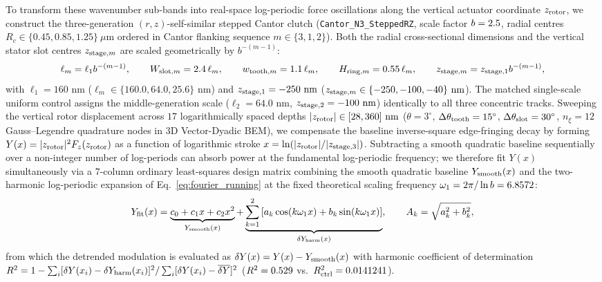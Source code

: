 \documentclass[pdflatex,sn-nature]{sn-jnl}
\begin{document}
To transform these wavenumber sub-bands into real-space log-periodic force oscillations along the vertical actuator coordinate $z_{\rm rotor}$, we construct the three-generation $(r,z)$-self-similar stepped Cantor clutch (\texttt{Cantor\_N3\_SteppedRZ}, scale factor $b = 2.5{}$, radial centres $R_c \in \{0.45, 0.85, 1.25\}\ \mu\text{m}$ ordered in Cantor flanking sequence $m \in \{3, 1, 2\}$). Both the radial cross-sectional dimensions and the vertical stator slot centres $z_{{\rm stage},m}$ are scaled geometrically by $b^{-(m-1)}$:
\begin{equation}
\ell_m = \ell_1 b^{-(m-1)}, \qquad
W_{{\rm slot},m} = 2.4\,\ell_m, \qquad
w_{{\rm tooth},m} = 1.1\,\ell_m, \qquad
H_{{\rm ring},m} = 0.55\,\ell_m, \qquad
z_{{\rm stage},m} = z_{{\rm stage},1} b^{-(m-1)},
\label{eq:methods_stepped_rz}
\end{equation}
with $\ell_1 = 160\text{ nm}$ ($\ell_m \in \{160.0, 64.0, 25.6\}\text{ nm}$) and $z_{{\rm stage},1} = -250\text{ nm}$ ($z_{{\rm stage},m} \in \{-250, -100, -40\}\text{ nm}$). The matched single-scale uniform control assigns the middle-generation scale ($\ell_2 = 64.0\text{ nm}$, $z_{{\rm stage},2} = -100\text{ nm}$) identically to all three concentric tracks. Sweeping the vertical rotor displacement across $17$ logarithmically spaced depths $|z_{\rm rotor}| \in [28, 360]\text{ nm}$ ($\theta = 3^\circ$, $\Delta\theta_{\rm tooth} = 15^\circ$, $\Delta\theta_{\rm slot} = 30^\circ$, $n_\xi = 12$ Gauss--Legendre quadrature nodes in 3D Vector-Dyadic BEM), we compensate the baseline inverse-square edge-fringing decay by forming $Y(x) = |z_{\rm rotor}|^2 F_z(z_{\rm rotor})$ as a function of logarithmic stroke $x = \ln(|z_{\rm rotor}| / |z_{{\rm stage},3}|)$. Subtracting a smooth quadratic baseline sequentially over a non-integer number of log-periods can absorb power at the fundamental log-periodic frequency; we therefore fit $Y(x)$ simultaneously via a $7$-column ordinary least-squares design matrix combining the smooth quadratic baseline $Y_{\rm smooth}(x)$ and the two-harmonic log-periodic expansion of Eq.~\eqref{eq:fourier_running} at the fixed theoretical scaling frequency $\omega_1 = 2\pi / \ln b = 6.8572{}$:
\begin{equation}
Y_{\rm fit}(x) = \underbrace{c_0 + c_1 x + c_2 x^2}_{Y_{\rm smooth}(x)} + \underbrace{\sum_{k=1}^{2} \left[ a_k \cos(k \omega_1 x) + b_k \sin(k \omega_1 x) \right]}_{\delta Y_{\rm harm}(x)}, \qquad A_k = \sqrt{a_k^2 + b_k^2},
\label{eq:methods_logper_fit}
\end{equation}
from which the detrended modulation is evaluated as $\delta Y(x) = Y(x) - Y_{\rm smooth}(x)$ with harmonic coefficient of determination $R^2 = 1 - \sum_i [\delta Y(x_i) - \delta Y_{\rm harm}(x_i)]^2 / \sum_i [\delta Y(x_i) - \overline{\delta Y}]^2$ ($R^2 = 0.529{}$ vs.\ $R^2_{\rm ctrl} = 0.0141241{}$).
\end{document}
